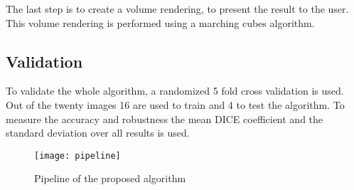 The last step is to create a volume rendering, to present the result to the user. This volume rendering is performed using a marching cubes algorithm.
\subsection{Validation}
To validate the whole algorithm, a randomized 5 fold cross validation is used. Out of the twenty images 16 are used to train and 4 to test the algorithm. To measure the accuracy and robustness the mean DICE coefficient and the standard deviation over all results is used.
\begin{figure*}[!t]
\centering
\texttt{[image: pipeline]}
\caption{Pipeline of the proposed algorithm}
\label{fig:pipeline}
\end{figure*}

